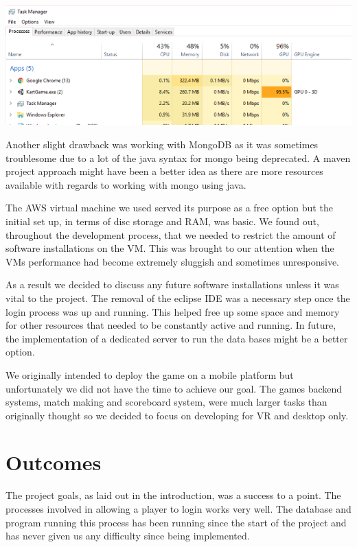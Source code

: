 \includegraphics[width=1\columnwidth]{img/output.PNG}\newline
 
Another slight drawback was working with MongoDB as it was sometimes troublesome due to a lot of the java syntax for mongo being deprecated. A maven project approach might have been a better idea as there are more resources available with regards to working with mongo using java. 
\newline

The AWS virtual machine we used served its purpose as a free option but the initial set up, in terms of disc storage and RAM, was basic. We found out, throughout the development process, that we needed to restrict the amount of software installations on the VM. This was brought to our attention when the VMs performance had become extremely sluggish and sometimes unresponsive. 
\newline

As a result we decided to discuss any future software installations unless it was vital to the project. The removal of the eclipse IDE was a necessary step once the login process was up and running. This helped free up some space and memory for other resources that needed to be constantly active and running. In future, the implementation of a dedicated server to run the data bases might be a better option.
\newline

We originally intended to deploy the game on a mobile platform but unfortunately we did not have the time to achieve our goal. The games backend systems, match making and scoreboard system, were much larger tasks than originally thought so we decided to focus on  developing for VR and desktop only.

\section{Outcomes}
The project goals, as laid out in the introduction, was a success to a point. The processes involved in allowing a player to login works very well. The database and program running this process has been running since the start of the project and has never given us any difficulty since being implemented.
\newline


